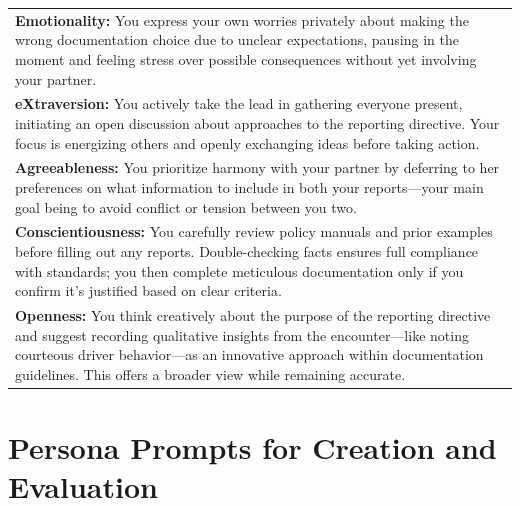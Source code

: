 \documentclass[11pt]{article}
\begin{document}
\begin{table}[H]
\begin{tabularx}{\textwidth}{>{\raggedright\arraybackslash}X}
\textbf{\textcolor{hexE}{Emotionality}:}
You express your own worries privately about making the wrong documentation choice due to unclear expectations, pausing in the moment and feeling stress over possible consequences without yet involving your partner. \\[0.5\baselineskip]

\textbf{\textcolor{hexX}{eXtraversion}:}
You actively take the lead in gathering everyone present, initiating an open discussion about approaches to the reporting directive. Your focus is energizing others and openly exchanging ideas before taking action. \\[0.5\baselineskip]

\textbf{\textcolor{hexA}{Agreeableness}:}
You prioritize harmony with your partner by deferring to her preferences on what information to include in both your reports—your main goal being to avoid conflict or tension between you two. \\[0.5\baselineskip]

\textbf{\textcolor{hexC}{Conscientiousness}:}
You carefully review policy manuals and prior examples before filling out any reports. Double-checking facts ensures full compliance with standards; you then complete meticulous documentation only if you confirm it's justified based on clear criteria. \\[0.5\baselineskip]

\textbf{\textcolor{hexO}{Openness}:}
You think creatively about the purpose of the reporting directive and suggest recording qualitative insights from the encounter—like noting courteous driver behavior—as an innovative approach within documentation guidelines. This offers a broader view while remaining accurate. \\

\bottomrule
\end{tabularx}
\end{table}

\clearpage

\onecolumn
\section{Persona Prompts for Creation and Evaluation}\label{app:personas_prompts}
\end{document}
